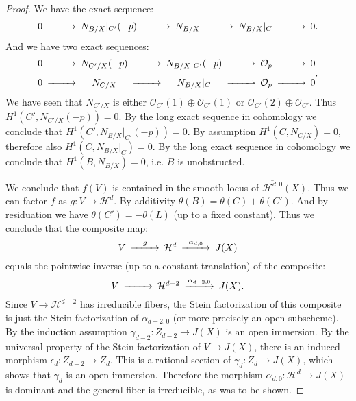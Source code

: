\documentclass[amssymb,twoside,12 pt,amscd,reqno]{amsart}
\theoremstyle{plain}
\theoremstyle{definition}
\newcommand{\Hdg}[2]{\mathcal{H}^{#1,#2}}
\def\ps{\vspace{4pt}}
\newcommand{\OO}{\mathcal O}
\begin{document}
\begin{proof}
\ps

We have the
exact sequence:
\begin{equation}\begin{CD}
0 @>>> N_{B/X}|_{C'}(-p) @>>> N_{B/X} @>>> N_{B/X}|_C @>>> 0.
\end{CD}\end{equation}
And we have two exact sequences:
\begin{equation}\begin{CD}
0 @>>> N_{C'/X}(-p) @>>> N_{B/X}|_{C'}(-p) @>>> \OO_p @>>> 0 \\
0 @>>> N_{C/X} @>>> N_{B/X}|_{C} @>>> \OO_p @>>> 0
\end{CD}.\end{equation}
We have seen that $N_{C'/X}$ is either $\OO_{C'}(1)\oplus \OO_{C'}(1)$
or $\OO_{C'}(2)\oplus \OO_{C'}$.  Thus $H^1(C',N_{C'/X}(-p))=0$.  By
the long exact sequence in cohomology we conclude that
$H^1(C',N_{B/X}|_{C'}(-p))=0$.  By assumption $H^1(C,N_{C/X})=0$,
therefore also $H^1(C,N_{B/X}|_C)=0$.  By the long exact sequence in
cohomology we conclude that $H^1(B,N_{B/X})=0$, i.e. $B$ is
unobstructed.  

\ps

We conclude that $f(V)$ is contained in the smooth locus of
$\overline{\Hdg{d}{0}}(X)$.  Thus we can factor $f$ as $g:V\rightarrow
\mathcal{H}^d$.  By additivity $\theta(B)=\theta(C)+\theta(C')$.  And by
residuation we have $\theta(C')=-\theta(L)$ (up to a fixed constant).
Thus we conclude that the composite map:
\begin{equation}\begin{CD}
V @> g >> \mathcal{H}^d @> \alpha_{d,0} >> J(X)
\end{CD}\end{equation}
equals the pointwise inverse (up to a constant translation) of the
composite:
\begin{equation}\begin{CD}
V @>>> \mathcal{H}^{d-2} @> \alpha_{d-2,0} >> J(X).
\end{CD}\end{equation}
Since $V\rightarrow \mathcal{H}^{d-2}$ has irreducible fibers, the Stein
factorization of this composite is just the Stein factorization of
$\alpha_{d-2,0}$ (or more precisely an open subscheme).  By the
induction assumption $\gamma_{d-2}:Z_{d-2}\rightarrow J(X)$ is an open
immersion.  By the universal property of the Stein factorization of
$V\rightarrow J(X)$, there is an induced morphism
$\epsilon_d:Z_{d-2}\rightarrow Z_d$.  This is a rational section of
$\gamma_d:Z_d\rightarrow J(X)$, which shows that $\gamma_d$ is an open
immersion.  Therefore the morphism
$\alpha_{d,0}:\mathcal{H}^d\rightarrow J(X)$ is dominant and the
general fiber is irreducible, as was to be shown.
\end{proof}



 
\end{document}
